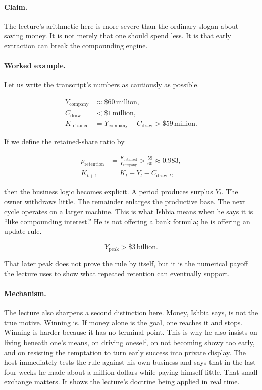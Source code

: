 \paragraph{Claim.} The lecture's arithmetic here is more severe than the ordinary slogan about saving money. It is not merely that one should spend less. It is that early extraction can break the compounding engine.

\paragraph{Worked example.} Let us write the transcript's numbers as cautiously as possible.

\begin{align}
Y_{\text{company}} &\approx \$60\,\text{million},\\
C_{\text{draw}} &< \$1\,\text{million},\\
K_{\text{retained}} &= Y_{\text{company}} - C_{\text{draw}} > \$59\,\text{million}.
\end{align}

If we define the retained-share ratio by

\begin{align}
\rho_{\text{retention}} &= \frac{K_{\text{retained}}}{Y_{\text{company}}} > \frac{59}{60} \approx 0.983,\\
K_{t+1} &= K_t + Y_t - C_{\text{draw},t},
\end{align}

then the business logic becomes explicit. A period produces surplus \(Y_t\). The owner withdraws little. The remainder enlarges the productive base. The next cycle operates on a larger machine. This is what Ishbia means when he says it is ``like compounding interest.'' He is not offering a bank formula; he is offering an update rule.

\begin{equation}
Y_{\text{peak}} > \$3\,\text{billion}.
\end{equation}

That later peak does not prove the rule by itself, but it is the numerical payoff the lecture uses to show what repeated retention can eventually support.

\paragraph{Mechanism.} The lecture also sharpens a second distinction here. Money, Ishbia says, is not the true motive. Winning is. If money alone is the goal, one reaches it and stops. Winning is harder because it has no terminal point. This is why he also insists on living beneath one's means, on driving oneself, on not becoming showy too early, and on resisting the temptation to turn early success into private display. The host immediately tests the rule against his own business and says that in the last four weeks he made about a million dollars while paying himself little. That small exchange matters. It shows the lecture's doctrine being applied in real time.

